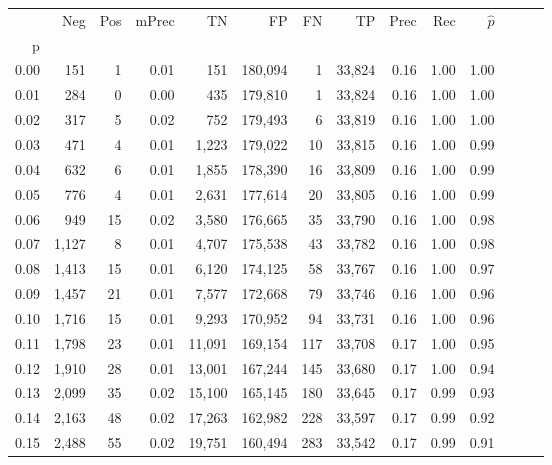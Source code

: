\begin{tabular}{rrrrrrrrrrrrrr}
\toprule
{} &    Neg &  Pos & mPrec &       TN &       FP &      FN &      TP &  Prec &   Rec & $\hat{p}$ \\
p    &        &      &       &          &          &         &         &       &       &           \\
\midrule
0.00 &    151 &    1 &  0.01 &      151 &  180,094 &       1 &  33,824 &  0.16 &  1.00 &      1.00 \\
0.01 &    284 &    0 &  0.00 &      435 &  179,810 &       1 &  33,824 &  0.16 &  1.00 &      1.00 \\
0.02 &    317 &    5 &  0.02 &      752 &  179,493 &       6 &  33,819 &  0.16 &  1.00 &      1.00 \\
0.03 &    471 &    4 &  0.01 &    1,223 &  179,022 &      10 &  33,815 &  0.16 &  1.00 &      0.99 \\
0.04 &    632 &    6 &  0.01 &    1,855 &  178,390 &      16 &  33,809 &  0.16 &  1.00 &      0.99 \\
0.05 &    776 &    4 &  0.01 &    2,631 &  177,614 &      20 &  33,805 &  0.16 &  1.00 &      0.99 \\
0.06 &    949 &   15 &  0.02 &    3,580 &  176,665 &      35 &  33,790 &  0.16 &  1.00 &      0.98 \\
0.07 &  1,127 &    8 &  0.01 &    4,707 &  175,538 &      43 &  33,782 &  0.16 &  1.00 &      0.98 \\
0.08 &  1,413 &   15 &  0.01 &    6,120 &  174,125 &      58 &  33,767 &  0.16 &  1.00 &      0.97 \\
0.09 &  1,457 &   21 &  0.01 &    7,577 &  172,668 &      79 &  33,746 &  0.16 &  1.00 &      0.96 \\
0.10 &  1,716 &   15 &  0.01 &    9,293 &  170,952 &      94 &  33,731 &  0.16 &  1.00 &      0.96 \\
0.11 &  1,798 &   23 &  0.01 &   11,091 &  169,154 &     117 &  33,708 &  0.17 &  1.00 &      0.95 \\
0.12 &  1,910 &   28 &  0.01 &   13,001 &  167,244 &     145 &  33,680 &  0.17 &  1.00 &      0.94 \\
0.13 &  2,099 &   35 &  0.02 &   15,100 &  165,145 &     180 &  33,645 &  0.17 &  0.99 &      0.93 \\
0.14 &  2,163 &   48 &  0.02 &   17,263 &  162,982 &     228 &  33,597 &  0.17 &  0.99 &      0.92 \\
0.15 &  2,488 &   55 &  0.02 &   19,751 &  160,494 &     283 &  33,542 &  0.17 &  0.99 &      0.91 \\

\end{tabular}
